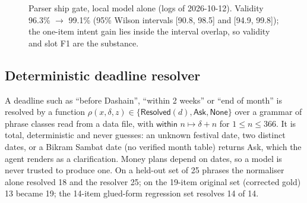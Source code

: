\documentclass[11pt,a4paper]{article}
\begin{document}
\begin{figure}[!tb]
\centering
{}
\caption{Parser ship gate, local model alone (logs of 2026-10-12). Validity 96.3\% $\to$ 99.1\% (95\% Wilson intervals [90.8, 98.5] and [94.9, 99.8]); the one-item intent gain lies inside the interval overlap, so validity and slot F1 are the substance.}\label{fig:ship}
\end{figure}

\subsection{Deterministic deadline resolver}
A deadline such as ``before Dashain'', ``within 2 weeks'' or ``end of month'' is resolved by a function $\rho(x,\delta,z)\in\{\textsf{Resolved}(d),\textsf{Ask},\textsf{None}\}$ over a grammar of phrase classes read from a data file, with $\textsf{within }n\mapsto\delta+n$ for $1\le n\le366$. It is total, deterministic and never guesses: an unknown festival date, two distinct dates, or a Bikram Sambat date (no verified month table) returns \textsf{Ask}, which the agent renders as a clarification. Money plans depend on dates, so a model is never trusted to produce one. On a held-out set of 25 phrases the normaliser alone resolved 18 and the resolver 25; on the 19-item original set (corrected gold) 13 became 19; the 14-item glued-form regression set resolves 14 of 14.
\end{document}
